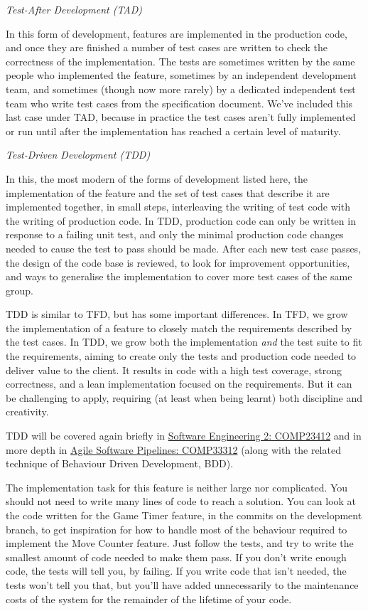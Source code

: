 \documentclass[
]{book}
\begin{document}
\emph{Test-After Development (TAD)}

In this form of development, features are implemented in the production code, and once they are finished a number of test cases are written to check the correctness of the implementation. The tests are sometimes written by the same people who implemented the feature, sometimes by an independent development team, and sometimes (though now more rarely) by a dedicated independent test team who write test cases from the specification document. We've included this last case under TAD, because in practice the test cases aren't fully implemented or run until after the implementation has reached a certain level of maturity.

\emph{Test-Driven Development (TDD)}

In this, the most modern of the forms of development listed here, the implementation of the feature and the set of test cases that describe it are implemented together, in small steps, interleaving the writing of test code with the writing of production code. In TDD, production code can only be written in response to a failing unit test, and only the minimal production code changes needed to cause the test to pass should be made. After each new test case passes, the design of the code base is reviewed, to look for improvement opportunities, and ways to generalise the implementation to cover more test cases of the same group.

TDD is similar to TFD, but has some important differences. In TFD, we grow the implementation of a feature to closely match the requirements described by the test cases. In TDD, we grow both the implementation \emph{and} the test suite to fit the requirements, aiming to create only the tests and production code needed to deliver value to the client. It results in code with a high test coverage, strong correctness, and a lean implementation focused on the requirements. But it can be challenging to apply, requiring (at least when being learnt) both discipline and creativity.

TDD will be covered again briefly in \href{https://studentnet.cs.manchester.ac.uk/ugt/COMP23412/syllabus/}{Software Engineering 2: COMP23412}
and in more depth in \href{https://studentnet.cs.manchester.ac.uk/ugt/COMP33312/syllabus/}{Agile Software Pipelines: COMP33312} (along with the related technique of Behaviour Driven Development, BDD).

The implementation task for this feature is neither large nor complicated. You should not need to write many lines of code to reach a solution. You can look at the code written for the Game Timer feature, in the commits on the development branch, to get inspiration for how to handle most of the behaviour required to implement the Move Counter feature. Just follow the tests, and try to write the smallest amount of code needed to make them pass. If you don't write enough code, the tests will tell you, by failing. If you write code that isn't needed, the tests won't tell you that, but you'll have added unnecessarily to the maintenance costs of the system for the remainder of the lifetime of your code.
\end{document}
